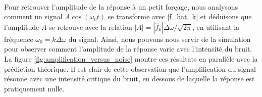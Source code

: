 \paragraph{} Pour retrouver l'amplitude de la réponse à un petit forçage, nous analysons comment un signal $A\cos(\omega_0 t)$ se transforme avec \ref{f_hat_k} et déduisons que l'amplitude $A$ se retrouve avec la relation $|A| = |\hat f_k|\Delta \omega/\sqrt{2\pi}$, en utilisant la fréquence $\omega_0=k\Delta\omega$ du signal. Ainsi, nous pouvons nous servir de la simulation pour observer comment l'amplitude de la réponse varie avec l'intensité du bruit. La figure \ref{fig:amplification_versus_noise} montre ces résultats en parallèle avec la prédiction théorique.
Il est clair de cette observation que l'amplification du signal résonne avec une intensité critique du bruit, en dessous de laquelle la réponse est pratiquement nulle.
